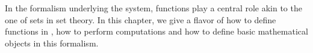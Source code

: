 \label{ch:prog}

%
%



In the formalism underlying the \Coq{} system, functions play a
central role akin to the one of sets in set theory. In this chapter,
we give a flavor of how to define functions in \Coq{}, how to perform
computations and how to define basic mathematical objects in this
formalism.


